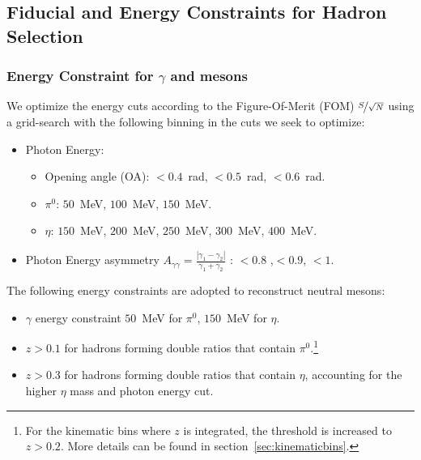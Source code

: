 \subsection{Fiducial and Energy Constraints for Hadron Selection}

\subsubsection{\texorpdfstring{Energy Constraint for $\gamma$ and mesons}{Energy Constraint for gamma and mesons}}

We optimize the energy cuts according to the Figure-Of-Merit (FOM) $\nicefrac{S}{\sqrt{N}}$ using a grid-search with the following binning in the cuts we seek to optimize:
\begin{itemize}
  \item Photon Energy:
    \begin{itemize}
      \item Opening angle (OA): $<0.4$~rad, $<0.5$~rad, $<0.6$~rad.
      \item $\pi^{0}$: $50$~MeV, $100$~MeV, $150$~MeV. 
      \item $\eta$: $150$~MeV, $200$~MeV, $250$~MeV, $300$~MeV, $400$~MeV. 
    \end{itemize}
  \item Photon Energy asymmetry $A_{\gamma\gamma}=\frac{|\gamma_1-\gamma_2|}{\gamma_1+\gamma_2}$ : $<0.8$ ,$<0.9$, $<1$.
\end{itemize}

\label{sec:energyconstraint}
The following energy constraints are adopted to reconstruct neutral mesons:
\begin{itemize}
\item $\gamma$ energy constraint $50$~MeV for $\pi^0$, $150$~MeV for $\eta$.
\item $z>0.1$ for hadrons forming double ratios that contain $\pi^0$.\footnote{For the kinematic bins where $z$ is  integrated, the threshold is increased to $z>0.2$. More details can be found in section~\ref{sec:kinematicbins}.}
\item $z>0.3$ for hadrons forming double ratios that contain $\eta$, accounting for the higher $\eta$ mass and photon energy cut. 
\end{itemize}

